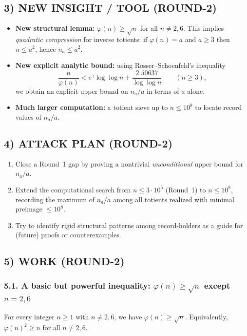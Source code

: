 \subsection*{3) NEW INSIGHT / TOOL (ROUND-2)}
\begin{itemize}
\item \textbf{New structural lemma:} $\varphi(n)\ge \sqrt n$ for all $n\neq 2,6$. This implies \emph{quadratic compression} for inverse totients: if $\varphi(n)=a$ and $a\ge 3$ then $n\le a^2$, hence $n_a\le a^2$.
\item \textbf{New explicit analytic bound:} using Rosser--Schoenfeld's inequality
\[\frac{n}{\varphi(n)}<e^{\gamma}\log\log n+\frac{2.50637}{\log\log n}\qquad(n\ge 3),\]
we obtain an explicit upper bound on $n_a/a$ in terms of $a$ alone.
\item \textbf{Much larger computation:} a totient sieve up to $n\le 10^8$ to locate record values of $n_a/a$.
\end{itemize}

\subsection*{4) ATTACK PLAN (ROUND-2)}
\begin{enumerate}
\item Close a Round~1 gap by proving a nontrivial \emph{unconditional} upper bound for $n_a/a$.
\item Extend the computational search from $n\le 3\cdot 10^5$ (Round~1) to $n\le 10^8$, recording the maximum of $n_a/a$ among all totients realized with minimal preimage $\le 10^8$.
\item Try to identify rigid structural patterns among record-holders as a guide for (future) proofs or counterexamples.
\end{enumerate}

\subsection*{5) WORK (ROUND-2)}

\subsubsection*{5.1. A basic but powerful inequality: $\varphi(n)\ge \sqrt n$ except $n=2,6$}
\begin{lemma}
For every integer $n\ge 1$ with $n\neq 2,6$, we have $\varphi(n)\ge \sqrt n$.
Equivalently, $\varphi(n)^2\ge n$ for all $n\neq 2,6$.
\end{lemma}

